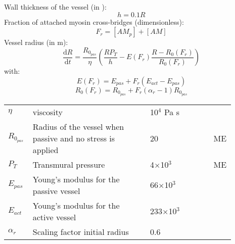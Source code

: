 Wall thickness of the vessel (in \um):
\begin{equation} \label{eq:h2}
h=0.1R
\end{equation}
%
Fraction of attached myosin cross-bridges (dimensionless):
\begin{equation}
F_r = [AM_p] + [AM]
\end{equation}
%
Vessel radius (in m):
\begin{equation} \label{eq:dRdt2e}
\dfrac{\mathrm{d}R}{\mathrm{d}t}= \frac{R_{0_{pas}}}{\eta}\left(   \frac{ R P_{T}}{h}  - E(F_r) \frac{R - R_0(F_r)}{R_0(F_r)} \right)
\end{equation}
%
with:
\begin{equation}
E(F_r)= E_{pas} + F_r \left(E_{act} - E_{pas} \right)
\end{equation}
%
\begin{equation}
R_0(F_r)=R_{0_{pas}} + F_r (\alpha_r -1) R_{0_{pas}}
\end{equation}
%
\newpage
\begin{table}[t!]
\centering
\begin{tabular}{ p{0.09\linewidth}  >{\footnotesize} p{0.5\linewidth}  >{\footnotesize} p{0.27\linewidth} >{\footnotesize} p{0.03\linewidth} }
\hline
$\eta   $				& viscosity															& 10$^4$ Pa s 		&  \cite{Koenigsberger2006}\\
$R_{0_{pas}}$			& Radius of the vessel when passive and no stress is applied		& 20  \um 		& ME \\
$P_T$					& Transmural pressure												& 4$\times$10$^3$ \Pa		& ME \\
${E}_{pas}$				& Young's modulus for the passive vessel								& 66$\times$10$^3$ \Pa 		&  \cite{Gore1985}\\
${E}_{act}$				& Young's modulus for the active vessel								& 233$\times$10$^3$ \Pa 	& \cite{Gore1985}\\
$\alpha_r$				& Scaling factor initial radius										& 0.6    		& \cite{Gore1985}\\
\hline
\end{tabular}
\label{tab:crossbridge}
\end{table}
\par
\par
\par
\par 
$~$
$~$
$~$
$~$
$~$
